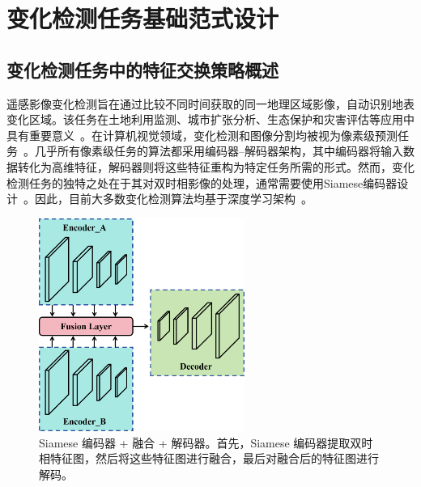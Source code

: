 
\chapter{变化检测任务基础范式设计}

\section{变化检测任务中的特征交换策略概述}
遥感影像变化检测旨在通过比较不同时间获取的同一地理区域影像，自动识别地表变化区域。该任务在土地利用监测、城市扩张分析、生态保护和灾害评估等应用中具有重要意义~\cite{ting_bai_deep_2023}。在计算机视觉领域，变化检测和图像分割均被视为像素级预测任务~\cite{YGXB202309001}。几乎所有像素级任务的算法都采用编码器–解码器架构，其中编码器将输入数据转化为高维特征，解码器则将这些特征重构为特定任务所需的形式。然而，变化检测任务的独特之处在于其对双时相影像的处理，通常需要使用Siamese编码器设计~\cite{dong_efficientcd_2024}。因此，目前大多数变化检测算法均基于深度学习架构~\cite{chen_remote_2022, zhang_swinsunet_2022, wang2022unetformer}。


\begin{figure}[!htbp]
  \centering
  \includegraphics[width=0.6\textwidth]{paper_figures/变化检测任务基础范式设计/SEED1a.png}
  \caption{Siamese 编码器 + 融合 + 解码器。首先，Siamese 编码器提取双时相特征图，然后将这些特征图进行融合，最后对融合后的特征图进行解码。}
  \label{fig:SEED1a}
\end{figure}


